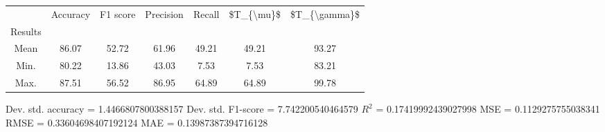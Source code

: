 \begin{tabular}{|c|c|c|c|c|c|c|}
\toprule
{} &  Accuracy &  F1 score &  Precision &  Recall &  \$T\_\{\textbackslash mu\}\$ &  \$T\_\{\textbackslash gamma\}\$ \\
Results &           &           &            &         &            &               \\
\hline
Mean    &     86.07 &     52.72 &      61.96 &   49.21 &      49.21 &         93.27 \\
Min.    &     80.22 &     13.86 &      43.03 &    7.53 &       7.53 &         83.21 \\
Max.    &     87.51 &     56.52 &      86.95 &   64.89 &      64.89 &         99.78 \\
\bottomrule
\end{tabular}

 Dev. std. accuracy = 1.4466807800388157
 Dev. std. F1-score = 7.742200540464579
 $R^2$ = 0.17419992439027998
 MSE = 0.1129275755038341
 RMSE = 0.33604698407192124
 MAE = 0.13987387394716128
